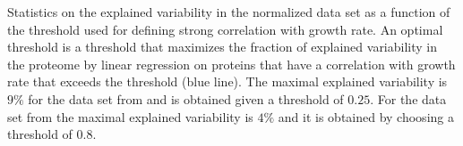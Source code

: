 \label{fig:threshold}
  Statistics on the explained variability in the normalized data set as a function of the threshold used for defining strong correlation with growth rate.
  An optimal threshold is a threshold that maximizes the fraction of explained variability in the proteome by linear regression on proteins that have a correlation with growth rate that exceeds the threshold (blue line).
  The maximal explained variability is $9\%$ for the data set from \cite{Heinemann2015} and is obtained given a threshold of $0.25$.
  For the data set from \cite{Valgepea2013} the maximal explained variability is $4\%$ and it is obtained by choosing a threshold of $0.8$.
